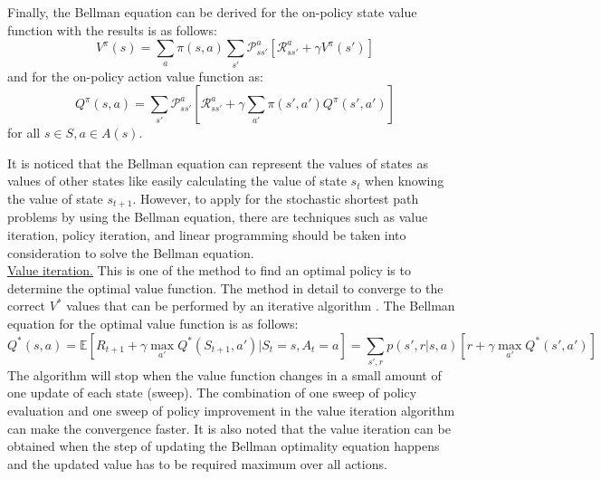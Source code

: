 \noindent Finally, the Bellman equation \cite{Bellman57_MDP} can be derived for the on-policy state value function with the results is as follows:
\begin{equation}
V^{\pi}(s) = \sum_{a}\pi(s,a)\sum_{s'}\mathcal{P}^a_{ss'}[\mathcal{R}^a_{ss'}+\gamma{V}^{\pi}(s')]
\end{equation}
and for the on-policy action value function as:
\begin{equation}
Q^{\pi}(s,a) = \sum_{s'}\mathcal{P}^a_{ss'}[\mathcal{R}^a_{ss'}+\gamma\sum_{a'}\pi(s',a'){Q}^{\pi}(s',a')]
\end{equation}
for all $s\in{S}, a\in{A(s)}$.

\noindent It is noticed that the Bellman equation can represent the values of states as values of other states like easily calculating the value of state $s_t$ when knowing the value of state $s_{t+1}$. However, to apply for the stochastic shortest path problems by using the Bellman equation, there are techniques such as  value iteration, policy iteration, and linear programming should be taken into consideration to solve the Bellman equation. \\

\noindent\uline{Value iteration.} This is one of the method to find an optimal policy is to determine the optimal value function. The method in detail to converge to the correct $V^*$ values that can be performed by an iterative algorithm \cite{Bellman57_DynamicProgramming, Bertsekas87_DynamicProgramming}. The Bellman equation for the optimal value function is as follows:
\begin{equation}
Q^{*}(s,a) 
= \mathbb{E}[R_{t+1} + \gamma \max_{a'}Q^{*}(S_{t+1},a')|S_{t}=s, A_{t}=a] 
= \sum_{s',r}p(s',r|s,a)[r+\gamma \max_{a'}Q^{*}(s',a')] 
\end{equation}
The algorithm will stop when the value function changes in a small amount of one update of each state (sweep). The combination of one sweep of policy evaluation and one sweep of policy improvement in the value iteration algorithm can make the convergence faster. It is also noted that the value iteration can be obtained when the step of updating the Bellman optimality equation happens and the updated value has to be required maximum over all actions. \\

